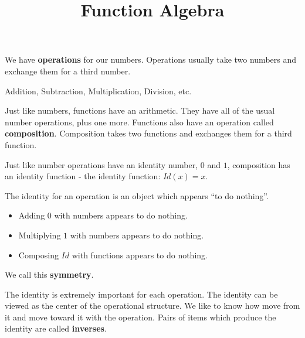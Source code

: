 \documentclass{ximera}
\title{Function Algebra}
\begin{document}
\begin{abstract}

\end{abstract}
\maketitle
















We have \textbf{operations} for our numbers.  Operations usually take two numbers and exchange them for a third number.

\begin{center}
Addition, Subtraction, Multiplication, Division, etc.
\end{center}



Just like numbers, functions have an arithmetic.  They have all of the usual number operations, plus one more.  Functions also have an operation called \textbf{\textcolor{purple!85!blue}{composition}}.  Composition takes two functions and exchanges them for a third function.

Just like number operations have an identity number, $0$ and $1$, composition has an identity function - the identity function: $Id(x) = x$.


The identity for an operation is an object which appears ``to do nothing''.  


\begin{itemize}
\item Adding $0$ with numbers appears to do nothing.
\item Multiplying $1$ with numbers appears to do nothing.
\item Composing $Id$ with functions appears to do nothing.
\end{itemize}




We call this \textbf{symmetry}.



The identity is extremely important for each operation.  The identity can be viewed as the center of the operational structure.  We like to know how move from it and move toward it with the operation.  Pairs of items which produce the identity are called \textbf{\textcolor{purple!85!blue}{inverses}}.
\end{document}
